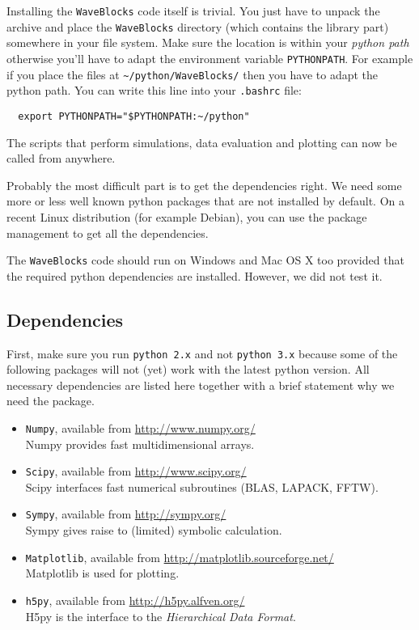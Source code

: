 \documentclass[a4paper,10pt]{report}
\begin{document}
Installing the \texttt{WaveBlocks} code itself is trivial. You just have to unpack
the archive and place the \texttt{WaveBlocks} directory (which contains the
library part) somewhere in your file system. Make sure the location is within
your \textit{python path} otherwise you'll have to adapt the environment variable
\texttt{PYTHONPATH}. For example if you place the files at \verb|~/python/WaveBlocks/|
then you have to adapt the python path. You can write this line into your \texttt{.bashrc}
file:

\begin{verbatim}
  export PYTHONPATH="$PYTHONPATH:~/python"
\end{verbatim}

The scripts that perform simulations, data evaluation and plotting can now be
called from anywhere.

Probably the most difficult part is to get the dependencies right. We need some
more or less well known python packages that are not installed by default. On a
recent Linux distribution (for example Debian), you can use the package management
to get all the dependencies.

The \texttt{WaveBlocks} code should run on Windows and Mac OS X too provided
that the required python dependencies are installed. However, we did not test it.

\subsection{Dependencies}

First, make sure you run \texttt{python 2.x} and not \texttt{python 3.x} because
some of the following packages will not (yet) work with the latest python version.
All necessary dependencies are listed here together with a brief statement why we
need the package.

\begin{itemize}
  \item \texttt{Numpy}, available from \url{http://www.numpy.org/} \\
        Numpy provides fast multidimensional arrays.
  \item \texttt{Scipy}, available from \url{http://www.scipy.org/} \\
        Scipy interfaces fast numerical subroutines (BLAS, LAPACK, FFTW).
  \item \texttt{Sympy}, available from \url{http://sympy.org/} \\
        Sympy gives raise to (limited) symbolic calculation.
  \item \texttt{Matplotlib}, available from \url{http://matplotlib.sourceforge.net/} \\
        Matplotlib is used for plotting.
  \item \texttt{h5py}, available from \url{http://h5py.alfven.org/} \\
        H5py is the interface to the \emph{Hierarchical Data Format}.
\end{itemize}
\end{document}
